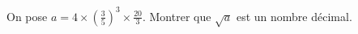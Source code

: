 
On pose $a=4\times \left(\frac{3}{5}\right)^3 \times \frac{20}{3}$. Montrer que $\sqrt{a}$ est un nombre décimal.